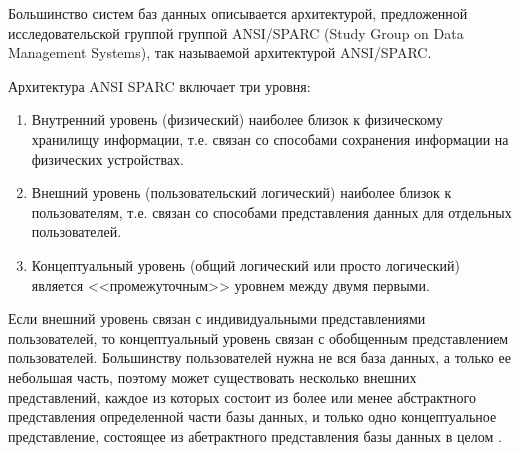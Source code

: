 Большинство систем баз данных описывается архитектурой, предложенной исследовательской группой
группой ANSI/SPARC (Study Group on Data Management Systems), так называемой
архитектурой ANSI/SPARC.

Архитектура ANSI SPARC включает три уровня:
\begin{enumerate} 
\item Внутренний уровень (физический) наиболее близок к физическому хранилищу информации, 
т.е. связан со способами сохранения информации на физических устройствах.

\item Внешний уровень (пользовательский логический) наиболее близок к пользователям, 
т.е. связан со способами представления данных для отдельных пользователей.

\item Концептуальный уровень (общий логический или просто логический) является <<промежуточным>>
уровнем между двумя первыми.
\end{enumerate}

Если внешний уровень связан с индивидуальными представлениями пользователей, то
концептуальный уровень связан с обобщенным представлением пользователей. Большинству
пользователей нужна не вся база данных, а
только ее небольшая часть, поэтому может существовать несколько внешних
представлений, каждое из которых состоит из более или менее абстрактного
представления определенной части базы данных, и только одно концептуальное
представление, состоящее из абетрактного представления базы данных в целом \cite{3}.